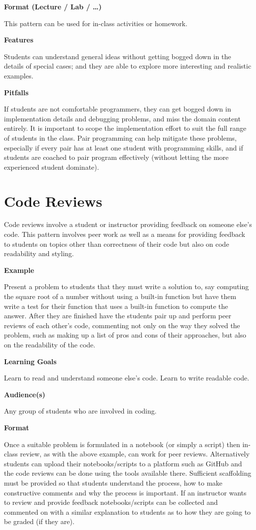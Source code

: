 \documentclass[]{book}
\begin{document}
\textbf{Format (Lecture / Lab / \ldots{})}

This pattern can be used for in-class activities or homework.

\textbf{Features}

Students can understand general ideas without getting bogged down in the
details of special cases; and they are able to explore more interesting
and realistic examples.

\textbf{Pitfalls}

If students are not comfortable programmers, they can get bogged down in
implementation details and debugging problems, and miss the domain
content entirely. It is important to scope the implementation effort to
suit the full range of students in the class. Pair programming can help
mitigate these problems, especially if every pair has at least one
student with programming skills, and if students are coached to pair
program effectively (without letting the more experienced student
dominate).

\section{Code Reviews}\label{code-reviews}

Code reviews involve a student or instructor providing feedback on
someone else's code. This pattern involves peer work as well as a means
for providing feedback to students on topics other than correctness of
their code but also on code readability and styling.

\textbf{Example}

Present a problem to students that they must write a solution to, say
computing the square root of a number without using a built-in function
but have them write a test for their function that uses a built-in
function to compute the answer. After they are finished have the
students pair up and perform peer reviews of each other's code,
commenting not only on the way they solved the problem, such as making
up a list of pros and cons of their approaches, but also on the
readability of the code.

\textbf{Learning Goals}

Learn to read and understand someone else's code. Learn to write
readable code.

\textbf{Audience(s)}

Any group of students who are involved in coding.

\textbf{Format}

Once a suitable problem is formulated in a notebook (or simply a script)
then in-class review, as with the above example, can work for peer
reviews. Alternatively students can upload their notebooks/scripts to a
platform such as GitHub and the code reviews can be done using the tools
available there. Sufficient scaffolding must be provided so that
students understand the process, how to make constructive comments and
why the process is important. If an instructor wants to review and
provide feedback notebooks/scripts can be collected and commented on
with a similar explanation to students as to how they are going to be
graded (if they are).
\end{document}
